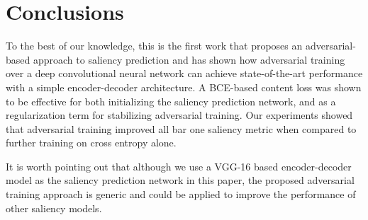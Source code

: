 \documentclass[times,twocolumn,final,authoryear]{elsarticle}
\begin{document}








\section{Conclusions}
\label{sec:Conclusions}

To the best of our knowledge, this is the first work that proposes an adversarial-based approach to saliency prediction and has shown how adversarial training over a deep convolutional neural network can achieve state-of-the-art performance with a simple encoder-decoder architecture.
A BCE-based content loss was shown to be effective for both initializing the saliency prediction network, and as a regularization term for stabilizing adversarial training. Our experiments showed that adversarial training improved all bar one saliency metric when compared to further training on cross entropy alone.

It is worth pointing out that although we use a VGG-16 based encoder-decoder model as the saliency prediction network in this paper, the proposed adversarial training approach is generic and could be applied to improve the performance of other saliency models. 
\end{document}
